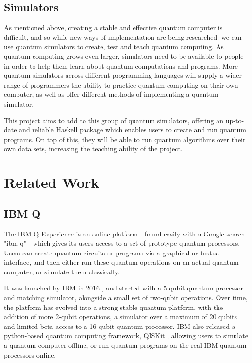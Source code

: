 \documentclass[a4paper,10pt, titlepage, twoside]{article}
\begin{document}
\subsection{Simulators}
As mentioned above, creating a stable and effective quantum computer is difficult, and so while new ways of implementation are being researched, we can use quantum simulators to create, test and teach quantum computing. As quantum computing grows even larger, simulators need to be available to people in order to help them learn about quantum computations and programs. More quantum simulators across different programming languages will supply a wider range of programmers the ability to practice quantum computing on their own computer, as well as offer different methods of implementing a quantum simulator.\par
This project aims to add to this group of quantum simulators, offering an up-to-date and reliable Haskell package which enables users to create and run quantum programs. On top of this, they will be able to run quantum algorithms over their own data sets, increasing the teaching ability of the project.

\section{Related Work}
\subsection{IBM Q}
The IBM Q Experience is an online platform \cite{ibmqexperience} - found easily with a Google search "ibm q" - which gives its users access to a set of prototype quantum processors. Users can create quantum circuits or programs via a graphical or textual interface, and then either run these quantum operations on an actual quantum computer, or simulate them classically.\par
It was launched by IBM in 2016 \cite{ibmlaunch}, and started with a 5 qubit quantum processor and matching simulator, alongside a small set of two-qubit operations. Over time, the platform has evolved into a strong stable quantum platform, with the addition of more 2-qubit operations, a simulator over a maximum of 20 qubits and limited beta access to a 16 qubit quantum processor. IBM also released a python-based quantum computing framework, QISKit \cite{qiskit}, allowing users to simulate a quantum computer offline, or run quantum programs on the real IBM quantum processors online.
\end{document}

